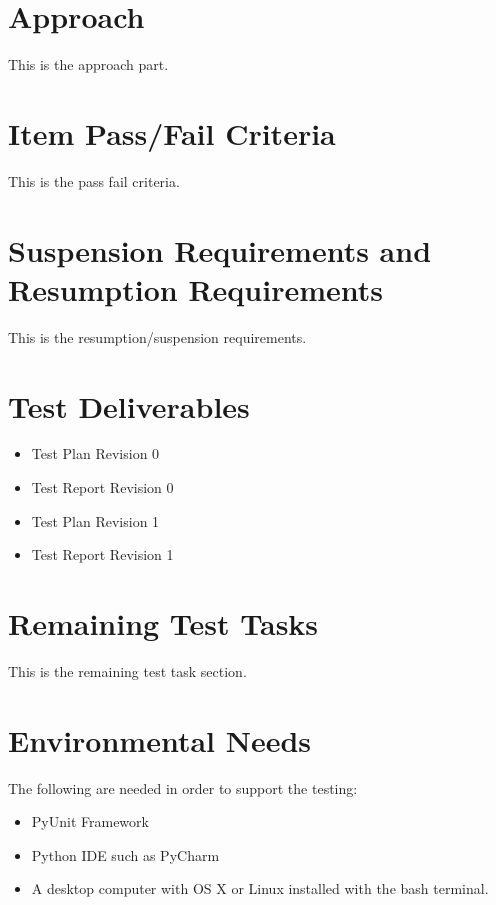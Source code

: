\documentclass{article}
\begin{document}
\section*{Approach}
This is the approach part.

\section*{Item Pass/Fail Criteria}
This is the pass fail criteria.

\section*{Suspension Requirements and Resumption Requirements}
This is the resumption/suspension requirements.

\section*{Test Deliverables}
\begin{itemize}
 \item
Test Plan Revision 0
 \item
Test Report Revision 0
 \item
Test Plan Revision 1
 \item
Test Report Revision 1
\end{itemize}

\section*{Remaining Test Tasks}
This is the remaining test task section.

\section*{Environmental Needs}
The following are needed in order to support the testing:
\newline
\begin{itemize}
 \item
PyUnit Framework
 \item
Python IDE such as PyCharm
 \item
A desktop computer with OS X or Linux installed with the bash terminal.
\end{itemize}
\end{document}
